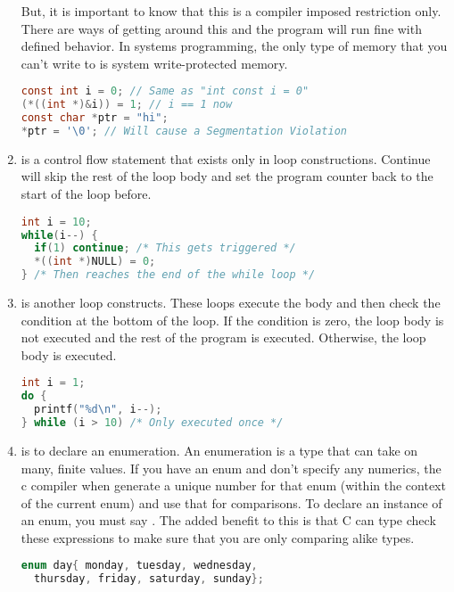 \begin{enumerate}
	      But, it is important to know that this is a compiler imposed restriction only.
        There are ways of getting around this and the program will run fine with defined behavior.
        In systems programming, the only type of memory that you can't write to is system write-protected memory.

	      \begin{lstlisting}[language=C]
const int i = 0; // Same as "int const i = 0"
(*((int *)&i)) = 1; // i == 1 now
const char *ptr = "hi";
*ptr = '\0'; // Will cause a Segmentation Violation
\end{lstlisting}

	    \item {} is a control flow statement that exists only in loop constructions.
        Continue will skip the rest of the loop body and set the program counter back to the start of the loop before.

	      \begin{lstlisting}[language=C]
int i = 10;
while(i--) {
  if(1) continue; /* This gets triggered */
  *((int *)NULL) = 0;
} /* Then reaches the end of the while loop */
\end{lstlisting}

	    \item {} is another loop constructs.
        These loops execute the body and then check the condition at the bottom of the loop.
        If the condition is zero, the loop body is not executed and the rest of the program is executed.
        Otherwise, the loop body is executed.

	      \begin{lstlisting}[language=C]
int i = 1;
do {
  printf("%d\n", i--);
} while (i > 10) /* Only executed once */
\end{lstlisting}

	    \item {} is to declare an enumeration.
        An enumeration is a type that can take on many, finite values.
        If you have an enum and don't specify any numerics, the c compiler when generate a unique number for that enum (within the context of the current enum) and use that for comparisons.
        To declare an instance of an enum, you must say .
        The added benefit to this is that C can type check these expressions to make sure that you are only comparing alike types.

	      \begin{lstlisting}[language=C]
enum day{ monday, tuesday, wednesday,
  thursday, friday, saturday, sunday};


\end{lstlisting}
\end{enumerate}
